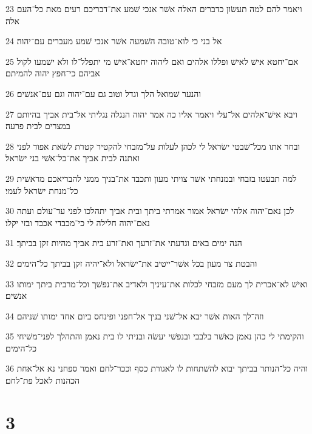\par 23 ויאמר להם למה תעשׂון כדברים האלה אשׁר אנכי שׁמע את־דבריכם רעים מאת כל־העם אלה׃
\par 24 אל בני כי לוא־טובה השׁמעה אשׁר אנכי שׁמע מעברים עם־יהוה׃
\par 25 אם־יחטא אישׁ לאישׁ ופללו אלהים ואם ליהוה יחטא־אישׁ מי יתפלל־לו ולא ישׁמעו לקול אביהם כי־חפץ יהוה להמיתם׃
\par 26 והנער שׁמואל הלך וגדל וטוב גם עם־יהוה וגם עם־אנשׁים׃
\par 27 ויבא אישׁ־אלהים אל־עלי ויאמר אליו כה אמר יהוה הנגלה נגליתי אל־בית אביך בהיותם במצרים לבית פרעה׃
\par 28 ובחר אתו מכל־שׁבטי ישׂראל לי לכהן לעלות על־מזבחי להקטיר קטרת לשׂאת אפוד לפני ואתנה לבית אביך את־כל־אשׁי בני ישׂראל׃
\par 29 למה תבעטו בזבחי ובמנחתי אשׁר צויתי מעון ותכבד את־בניך ממני להבריאכם מראשׁית כל־מנחת ישׂראל לעמי׃
\par 30 לכן נאם־יהוה אלהי ישׂראל אמור אמרתי ביתך ובית אביך יתהלכו לפני עד־עולם ועתה נאם־יהוה חלילה לי כי־מכבדי אכבד ובזי יקלו׃
\par 31 הנה ימים באים וגדעתי את־זרעך ואת־זרע בית אביך מהיות זקן בביתך׃
\par 32 והבטת צר מעון בכל אשׁר־ייטיב את־ישׂראל ולא־יהיה זקן בביתך כל־הימים׃
\par 33 ואישׁ לא־אכרית לך מעם מזבחי לכלות את־עיניך ולאדיב את־נפשׁך וכל־מרבית ביתך ימותו אנשׁים׃
\par 34 וזה־לך האות אשׁר יבא אל־שׁני בניך אל־חפני ופינחס ביום אחד ימותו שׁניהם׃
\par 35 והקימתי לי כהן נאמן כאשׁר בלבבי ובנפשׁי יעשׂה ובניתי לו בית נאמן והתהלך לפני־משׁיחי כל־הימים׃
\par 36 והיה כל־הנותר בביתך יבוא להשׁתחות לו לאגורת כסף וככר־לחם ואמר ספחני נא אל־אחת הכהנות לאכל פת־לחם׃

\chapter{3}

